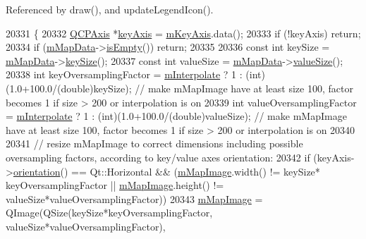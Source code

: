 Referenced by draw(), and update\+Legend\+Icon().


\begin{DoxyCode}
20331 \{
20332   \hyperlink{class_q_c_p_axis}{QCPAxis} *\hyperlink{class_q_c_p_abstract_plottable_a72c7a09c22963f2c943f07112b311103}{keyAxis} = \hyperlink{class_q_c_p_abstract_plottable_a426f42e254d0f8ce5436a868c61a6827}{mKeyAxis}.data();
20333   \textcolor{keywordflow}{if} (!keyAxis) \textcolor{keywordflow}{return};
20334   \textcolor{keywordflow}{if} (\hyperlink{class_q_c_p_color_map_a8709272aa8f0be3ca111bf3866806f8b}{mMapData}->\hyperlink{class_q_c_p_color_map_data_a986009324aee1fc5f696db46bd03dde5}{isEmpty}()) \textcolor{keywordflow}{return};
20335   
20336   \textcolor{keyword}{const} \textcolor{keywordtype}{int} keySize = \hyperlink{class_q_c_p_color_map_a8709272aa8f0be3ca111bf3866806f8b}{mMapData}->\hyperlink{class_q_c_p_color_map_data_aa8d7811686fdfea964947715210c4af8}{keySize}();
20337   \textcolor{keyword}{const} \textcolor{keywordtype}{int} valueSize = \hyperlink{class_q_c_p_color_map_a8709272aa8f0be3ca111bf3866806f8b}{mMapData}->\hyperlink{class_q_c_p_color_map_data_ab880be6bc587f34e8d22fe77ef6b57e9}{valueSize}();
20338   \textcolor{keywordtype}{int} keyOversamplingFactor = \hyperlink{class_q_c_p_color_map_af77e5eba9a844592648edeb6fbe834f1}{mInterpolate} ? 1 : (int)(1.0+100.0/(\textcolor{keywordtype}{double})keySize); \textcolor{comment}{// make
       mMapImage have at least size 100, factor becomes 1 if size > 200 or interpolation is on}
20339   \textcolor{keywordtype}{int} valueOversamplingFactor = \hyperlink{class_q_c_p_color_map_af77e5eba9a844592648edeb6fbe834f1}{mInterpolate} ? 1 : (int)(1.0+100.0/(\textcolor{keywordtype}{double})valueSize); \textcolor{comment}{// make
       mMapImage have at least size 100, factor becomes 1 if size > 200 or interpolation is on}
20340   
20341   \textcolor{comment}{// resize mMapImage to correct dimensions including possible oversampling factors, according to key/value
       axes orientation:}
20342   \textcolor{keywordflow}{if} (keyAxis->\hyperlink{class_q_c_p_axis_a57483f2f60145ddc9e63f3af53959265}{orientation}() == Qt::Horizontal && (\hyperlink{class_q_c_p_color_map_a66110813b42eca78b64095b2a1f285a0}{mMapImage}.width() != keySize*
      keyOversamplingFactor || \hyperlink{class_q_c_p_color_map_a66110813b42eca78b64095b2a1f285a0}{mMapImage}.height() != valueSize*valueOversamplingFactor))
20343     \hyperlink{class_q_c_p_color_map_a66110813b42eca78b64095b2a1f285a0}{mMapImage} = QImage(QSize(keySize*keyOversamplingFactor, valueSize*valueOversamplingFactor), 

\end{DoxyCode}
